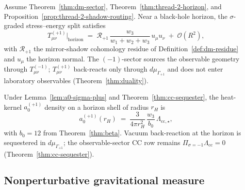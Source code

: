\begin{proposition}
\label{prop:thread-2-shadow-stress}
Assume Theorem~\ref{thm:dm-sector}, Theorem~\ref{thm:thread-2-horizon}, and
Proposition~\ref{prop:thread-2-shadow-routing}. Near a black-hole horizon, the
$\sigma$-graded stress--energy split satisfies
\begin{equation}\label{eq:thread2-shadow-stress}
  T_{\mu\nu}^{(+1)}\big|_{\mathrm{horizon}}
  \;=\;
  \mathcal{R}_{+1}\,
  \frac{w_3}{w_1+w_2+w_3}\,
  u_\mu u_\nu
  \;+\;
  \mathcal{O}(R^2),
\end{equation}
with $\mathcal{R}_{+1}$ the mirror-shadow cohomology residue of
Definition~\ref{def:dm-residue} and $u_\mu$ the horizon normal. The
$(-1)$-sector sources the observable geometry through $T_{\mu\nu}^{(-1)}$;
$T_{\mu\nu}^{(+1)}$ back-reacts only through $d\mu_{\Gamma_{+1}}$ and does
not enter laboratory observables (Theorem~\ref{thm:duality}).
\end{proposition}

\begin{lemma}
\label{lem:thread-2-a0-horizon}
Under Lemma~\ref{lem:a0-sigma-plus} and Theorem~\ref{thm:cc-sequester}, the
heat-kernel $a_0^{(+1)}$ density on a horizon shell of radius $r_H$ is
\begin{equation}\label{eq:thread2-a0-horizon}
  a_0^{(+1)}(r_H)
  \;=\;
  \frac{3}{4\pi r_H^2}\,
  \frac{w_3}{b_0}\,
  \Lambda_{\mathrm{cc},\star},
\end{equation}
with $b_0=12$ from Theorem~\ref{thm:beta}. Vacuum back-reaction at the horizon
is sequestered in $d\mu_{\Gamma_{+1}}$; the observable-sector CC row remains
$\Pi_{\sigma=-1}\Lambda_{\mathrm{cc}}=0$ (Theorem~\ref{thm:cc-sequester}).
\end{lemma}

\subsection{Nonperturbative gravitational measure}
\label{sec:wave5-thread2:np}

